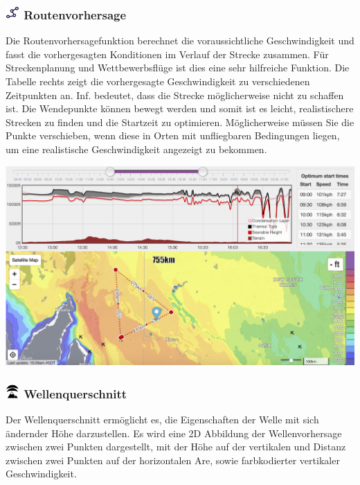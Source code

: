 \documentclass[9pt,a4paper,twocolumn]{article}
\begin{document}
\subsubsection*{\includegraphics[height=15pt]{images/icons/route.png} Routenvorhersage}
Die Routenvorhersagefunktion berechnet die voraussichtliche Geschwindigkeit und fasst die vorhergesagten Konditionen im Verlauf der Strecke zusammen. Für Streckenplanung und Wettbewerbsflüge ist dies eine sehr hilfreiche Funktion. Die Tabelle rechts zeigt die vorhergesagte Geschwindigkeit zu verschiedenen Zeitpunkten an. Inf. bedeutet, dass die Strecke möglicherweise nicht zu schaffen ist. Die Wendepunkte können bewegt werden und somit ist es leicht, realistischere Strecken zu finden und die Startzeit zu optimieren. 
Möglicherweise müssen Sie die Punkte verschieben, wenn diese in Orten mit unfliegbaren Bedingungen liegen, um eine realistische Geschwindigkeit angezeigt zu bekommen.


\includegraphics[width=\linewidth]{images/route.png}
\subsubsection*{\includegraphics[height=15pt]{images/icons/wave.png} Wellenquerschnitt}
Der Wellenquerschnitt ermöglicht es, die Eigenschaften der Welle mit sich ändernder Höhe darzustellen. Es wird eine 2D Abbildung der Wellenvorhersage zwischen zwei Punkten dargestellt, mit der Höhe auf der vertikalen und Distanz zwischen zwei Punkten auf der horizontalen Are, sowie farbkodierter vertikaler Geschwindigkeit.
\end{document}
